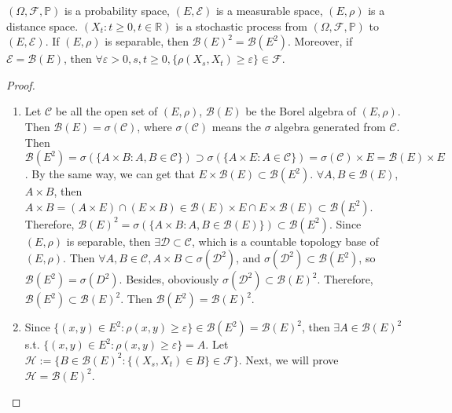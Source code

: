 \documentclass{ctexart}
\begin{document}
\begin{lemma}\label{lem:2.2}
  \((\Omega,\mathscr{F},\mathbb{P})\) is a probability space, \((E,\mathscr{E})\) is a
  measurable space, \((E,\rho)\) is a distance space.
  \((X_t:t \geq 0, t \in \mathbb{R})\) is a stochastic process from
  \((\Omega,\mathscr{F},\mathbb{P})\) to \((E,\mathscr{E})\).
  If \((E, \rho)\) is separable, then \(\mathscr{B}(E)^2= \mathscr{B}(E^2)\).
  Moreover, if \(\mathscr{E} = \mathscr{B}(E)\), then \(\forall \varepsilon>0, s,t \geq 0, \{\rho(X_s,X_t) \geq \varepsilon\} \in \mathscr{F}\).

\end{lemma}
\begin{proof}
  \begin{enumerate}
    \item Let \(\mathscr{C}\) be all the open set of \((E,\rho)\), \(\mathscr{B}(E)\) be the Borel algebra
      of \((E,\rho)\). Then \(\mathscr{B}(E) = \sigma(\mathscr{C})\), where \(\sigma(\mathscr{C})\)
      means the \(\sigma\) algebra generated from \(\mathscr{C}\).
      Then \(\mathscr{B}(E^2)= \sigma(\{A \times B: A, B \in \mathscr{C}\}) \supset \sigma(\{A \times E :A \in \mathscr{C}\}) = \sigma(\mathscr{C})\times E=\mathscr{B}(E) \times E\).
      By the same way, we can get that \(E \times \mathscr{B}(E) \subset \mathscr{B}(E^2)\).
      \(\forall A,B \in \mathscr{B}(E)\), \(A \times B\), then \( A \times B= (A \times E) \cap (E \times B) \in \mathscr{B}(E) \times E \cap E \times \mathscr{B}(E) \subset \mathscr{B}(E^2)\).
      Therefore, \(\mathscr{B}(E)^2 = \sigma(\{A \times B: A, B \in \mathscr{B}(E)\}) \subset \mathscr{B}(E^2)\).
      Since \((E,\rho)\) is separable, then \(\exists \mathscr{D} \subset \mathscr{C}\), which
      is a countable topology base of \((E,\rho)\).
      Then \(\forall A,B \in \mathscr{C}, A \times B \subset \sigma(\mathscr{D}^2)\),
      and \(\sigma(\mathscr{D}^2) \subset \mathscr{B}(E^2)\),
      so \(\mathscr{B}(E^2)= \sigma(D^2)\).
      Besides, oboviously \(\sigma(\mathscr{D}^2) \subset \mathscr{B}(E)^2\).
      Therefore, \(\mathscr{B}(E^2) \subset \mathscr{B}(E)^2\).
      Then \(\mathscr{B}(E^2) = \mathscr{B}(E)^2\).
    \item Since \(\{(x,y) \in E^2: \rho(x,y) \geq \varepsilon\} \in \mathscr{B}(E^2) = \mathscr{B}(E)^2\),
      then \(\exists A \in \mathscr{B}(E)^2\) s.t.
      \(\{(x,y) \in E^2: \rho(x,y) \geq \varepsilon\} = A\).
      Let \(\mathscr{H}:= \{B \in \mathscr{B}(E)^2: \{(X_s,X_t) \in B\} \in \mathscr{F}\}\).
      Next, we will prove \(\mathscr{H} = \mathscr{B}(E)^2\).

\end{enumerate}
\end{proof}
\end{document}
